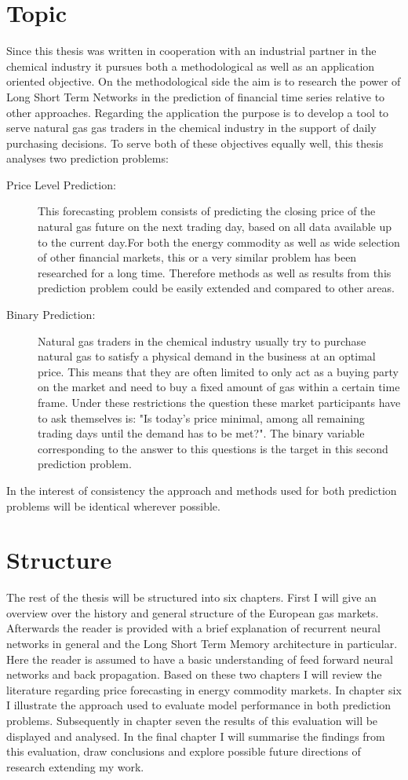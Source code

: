 \section{Topic}
Since this thesis was written in cooperation with an industrial partner in the chemical industry it pursues both a methodological as well as an application oriented objective. On the methodological side the aim is to research the power of Long Short Term Networks in the prediction of financial time series relative to other approaches. Regarding the application the purpose is to develop a tool to serve natural gas gas traders in the chemical industry in the support of daily purchasing decisions. To serve both of these objectives equally well, this thesis analyses two prediction problems:
\begin{description}
\item[Price Level Prediction:] This forecasting problem consists of predicting the closing price of the natural gas future on the next trading day, based on all data available up to the current day.For both the energy commodity as well as wide selection of other financial markets, this or a very similar problem has been researched for a long time. Therefore methods as well as results from this prediction problem could be easily extended and compared to other areas.
\item[Binary Prediction:] Natural gas traders in the chemical industry usually try to purchase natural gas to satisfy a physical demand in the business at an optimal price. This means that they are often limited to only act as a buying party on the market and need to buy a fixed amount of gas within a certain time frame. Under these restrictions the question these market participants have to ask themselves is: "Is today's price minimal, among all remaining trading days until the demand has to be met?". The binary variable corresponding to the answer to this questions is the target in this second prediction problem.
\end{description}
In the interest of consistency the approach and methods used for both prediction problems will be identical wherever possible.
\section{Structure}
The rest of the thesis will be structured into six chapters. First I will give an overview over the history and general structure of the European gas markets. Afterwards the reader is provided with a brief explanation of recurrent neural networks in general and the Long Short Term Memory architecture in particular. Here the reader is assumed to have a basic understanding of feed forward neural networks and back propagation. Based on these two chapters I will review the literature regarding price forecasting in energy commodity markets. In chapter six I illustrate the approach used to evaluate model performance in both prediction problems. Subsequently in chapter seven the results of this evaluation will be displayed and analysed. In the final chapter I will summarise the findings from this evaluation, draw conclusions and explore possible future directions of research extending my work. 